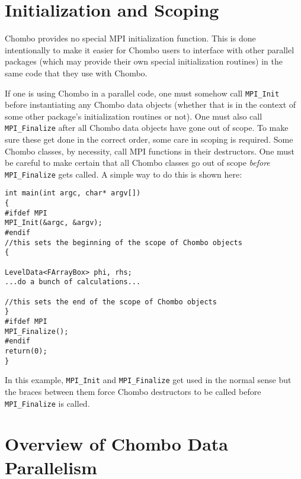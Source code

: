 \section{Initialization and Scoping}

Chombo provides no special MPI initialization function.
This is done intentionally to make it easier for
Chombo users to interface with other parallel
packages (which may provide their own special 
initialization routines) in the same code that
they use with Chombo.

If one is using Chombo in a parallel code, 
one must somehow call \verb/MPI_Init/ before instantiating any Chombo
data objects (whether that is in the context of some other package's
initialization routines or not). One must also call 
\verb/MPI_Finalize/ after all Chombo data objects have gone
out of scope.   To make sure these get done
in the correct order, some care in scoping is required.
Some Chombo classes, by necessity, call MPI functions
in their destructors.  One must be careful to make 
certain that all Chombo classes go out of scope 
{\it before} \verb/MPI_Finalize/ gets called.  A simple
way to do this is shown here:
\small \begin{verbatim}
int main(int argc, char* argv[])
{
#ifdef MPI
MPI_Init(&argc, &argv);
#endif
//this sets the beginning of the scope of Chombo objects
{

LevelData<FArrayBox> phi, rhs;
...do a bunch of calculations...

//this sets the end of the scope of Chombo objects
}
#ifdef MPI
MPI_Finalize();
#endif
return(0);
}
\end{verbatim} \normalsize
In this example, \verb/MPI_Init/ and \verb/MPI_Finalize/
get used in the normal sense but the  braces between them
force Chombo destructors to be called before 
\verb/MPI_Finalize/ is called.


\section{Overview of Chombo Data Parallelism}

